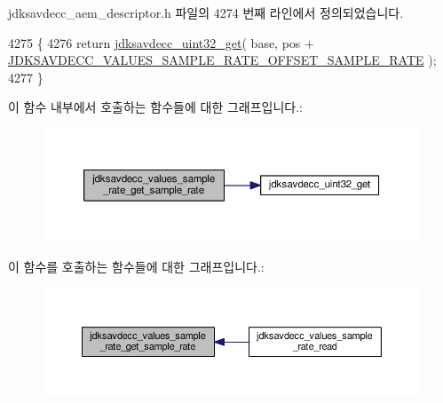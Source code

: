 jdksavdecc\+\_\+aem\+\_\+descriptor.\+h 파일의 4274 번째 라인에서 정의되었습니다.


\begin{DoxyCode}
4275 \{
4276     \textcolor{keywordflow}{return} \hyperlink{group__endian_gaefcf5bd4f368997a82f358ab89052d6b}{jdksavdecc\_uint32\_get}( base, pos + 
      \hyperlink{group__values__sample__rate_gaf29b13a09308cac988def8da251a6d72}{JDKSAVDECC\_VALUES\_SAMPLE\_RATE\_OFFSET\_SAMPLE\_RATE} );
4277 \}
\end{DoxyCode}


이 함수 내부에서 호출하는 함수들에 대한 그래프입니다.\+:
\nopagebreak
\begin{figure}[H]
\begin{center}
\leavevmode
\includegraphics[width=350pt]{group__values__sample__rate_ga5a6516a3d0a0d2b8c1f6f00f18c1d732_cgraph}
\end{center}
\end{figure}




이 함수를 호출하는 함수들에 대한 그래프입니다.\+:
\nopagebreak
\begin{figure}[H]
\begin{center}
\leavevmode
\includegraphics[width=350pt]{group__values__sample__rate_ga5a6516a3d0a0d2b8c1f6f00f18c1d732_icgraph}
\end{center}
\end{figure}


